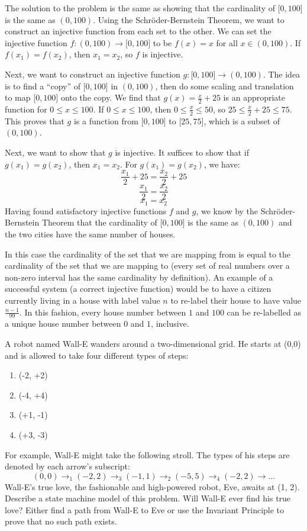 \documentclass[solution, letterpaper]{cs20}
\begin{document}
\begin{solution}
\subsolution The solution to the problem is the same as showing that the cardinality of $\big[0,100\big]$ is the same as $(0,100)$. Using the Schr\"{o}der-Bernstein Theorem, we want to construct an injective function from each set to the other. We can set the injective function $f : (0, 100) \rightarrow \big[0, 100\big]$ to be $f(x) = x$ for all $x \in (0, 100)$. If $f(x_1) = f(x_2)$, then $x_1 = x_2$, so $f$ is injective.

Next, we want to construct an injective function $g : \big[0, 100\big] \rightarrow (0, 100)$. The idea is to find a ``copy'' of $\big[0, 100\big]$ in $(0, 100)$, then do some scaling and translation to map $\big[0, 100\big]$ onto the copy. We find that $g(x) = \frac{x}{2} + 25$ is an appropriate function for $0 \leq x \leq 100$. If $0 \leq x \leq 100$, then $0 \leq \frac{x}{2} \leq 50$, so $25 \leq \frac{x}{2} + 25 \leq 75$. This proves that $g$ is a function from $\big[0, 100\big]$ to $\big[25, 75\big]$, which is a subset of $(0,100)$.

Next, we want to show that $g$ is injective. It suffices to show that if $g(x_1) = g(x_2)$, then $x_1 = x_2$. For $g(x_1) = g(x_2)$, we have: 
$$\frac{x_1}{2} + 25 = \frac{x_2}{2} + 25$$
$$\frac{x_1}{2} = \frac{x_2}{2}$$
$$x_1 = x_2$$
Having found satisfactory injective functions $f$ and $g$, we know by the Schr\"{o}der-Bernstein Theorem that the cardinality of $\big[0,100\big]$ is the same as $(0,100)$ and the two cities have the same number of houses.

\subsolution In this case the cardinality of the set that we are mapping from is equal to the cardinality of the set that we are mapping to (every set of real numbers over a non-zero interval has the same cardinality by definition). An example of a successful system (a correct injective function) would be to have a citizen currently living in a house with label value $n$ to re-label their house to have value $\frac{n-1}{99}$. In this fashion, every house number between $1$ and $100$ can be re-labelled as a unique house number between $0$ and $1$, inclusive.
\end{solution}

A robot named Wall-E wanders around a two-dimensional grid. He starts at (0,0) and is allowed to take four different types of steps:
\begin{enumerate}
\item (-2, +2)
\item (-4, +4)
\item (+1, -1)
\item (+3, -3)
\end{enumerate}
For example, Wall-E might take the following stroll. The types of his steps are denoted by each arrow's subscript:
$$(0,0) \to_1 (-2,2) \to_3 (-1,1) \to_2 (-5,5) \to_4 (-2,2) \to \ldots$$
Wall-E's true love, the fashionable and high-powered robot, Eve, awaits at (1, 2).
\subproblem Describe a state machine model of this problem.
\subproblem Will Wall-E ever find his true love? Either find a path from Wall-E to Eve or use the Invariant Principle to prove that no such path exists.
\end{document}
